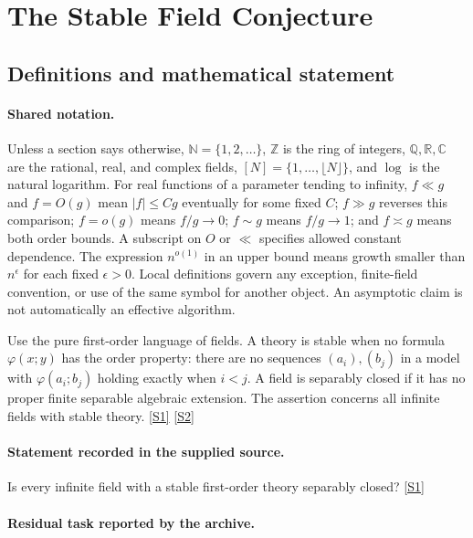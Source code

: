 \documentclass[11pt,a4paper]{article}
\newcommand{\N}{\mathbb{N}}
\newcommand{\Z}{\mathbb{Z}}
\newcommand{\Q}{\mathbb{Q}}
\newcommand{\R}{\mathbb{R}}
\newcommand{\C}{\mathbb{C}}
\newcommand{\sref}[2]{\hyperlink{source:#1:#2}{[S#2]}}
\begin{document}
\section{The Stable Field Conjecture}\label{statement}


\subsection{Definitions and mathematical statement}

\paragraph{Shared notation.}Unless a section says otherwise, $\N=\{1,2,\ldots\}$,
$\Z$ is the ring of integers, $\Q,\R,\C$ are the rational, real, and complex
fields, $[N]=\{1,\ldots,\lfloor N\rfloor\}$, and $\log$ is the natural
logarithm. For real functions of a parameter tending to infinity,
$f\ll g$ and $f=O(g)$ mean $|f|\leq Cg$ eventually for some fixed $C$;
$f\gg g$ reverses this comparison; $f=o(g)$ means $f/g\to0$;
$f\sim g$ means $f/g\to1$; and $f\asymp g$ means both order bounds.
A subscript on $O$ or $\ll$ specifies allowed constant dependence.
The expression $n^{o(1)}$ in an upper bound means growth smaller than
$n^\epsilon$ for each fixed $\epsilon>0$. Local definitions govern any
exception, finite-field convention, or use of the same symbol for another
object. An asymptotic claim is not automatically an effective algorithm.



Use the pure first-order language of fields. A theory is stable when no formula $\varphi(x;y)$ has the order property: there are no sequences $(a_i),(b_j)$ in a model with $\varphi(a_i;b_j)$ holding exactly when $i<j$. A field is separably closed if it has no proper finite separable algebraic extension. The assertion concerns all infinite fields with stable theory. \sref{statement}{1} \sref{statement}{2}

\paragraph{Statement recorded in the supplied source.}
Is every infinite field with a stable first-order theory separably closed? \sref{statement}{1}

\paragraph{Residual task reported by the archive.}
\end{document}
